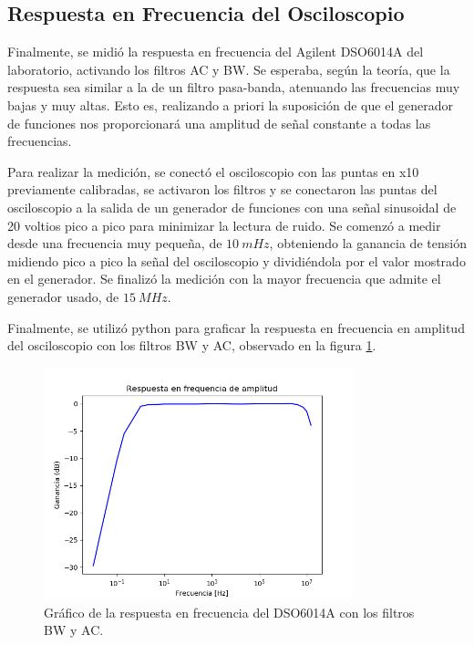 \documentclass[11pt, a4paper]{article}
\begin{document}
\break

\subsection*{Respuesta en Frecuencia del Osciloscopio}
Finalmente, se midió la respuesta en frecuencia del Agilent DSO6014A del laboratorio, activando los filtros AC y BW. Se esperaba, según la teoría, que la respuesta sea similar a la de un filtro pasa-banda, atenuando las frecuencias muy bajas y muy altas. Esto es, realizando a priori la suposición de que el generador de funciones nos proporcionará una amplitud de señal constante a todas las frecuencias.

Para realizar la medición, se conectó el osciloscopio con las puntas en x10 previamente calibradas, se activaron los filtros y se conectaron las puntas del osciloscopio a la salida de un generador de funciones con una señal sinusoidal de 20 voltios pico a pico para minimizar la lectura de ruido. Se comenzó a medir desde una frecuencia muy pequeña, de $10 \ mHz$, obteniendo la ganancia de tensión midiendo pico a pico la señal del osciloscopio y dividiéndola por el valor mostrado en el generador. Se finalizó la medición con la mayor frecuencia que admite el generador usado, de $15 \ MHz$.

Finalmente, se utilizó python para graficar la respuesta en frecuencia en amplitud del osciloscopio con los filtros BW y AC, observado en la figura \ref{graf:resp_freq_osci}.

\begin{figure}[H]
	\centering
	\includegraphics[width=0.8\textwidth]{resp_freq_osci.png}
	\caption{Gráfico de la respuesta en frecuencia del DSO6014A con los filtros BW y AC.} 
	\label{graf:resp_freq_osci}
\end{figure}
\end{document}
